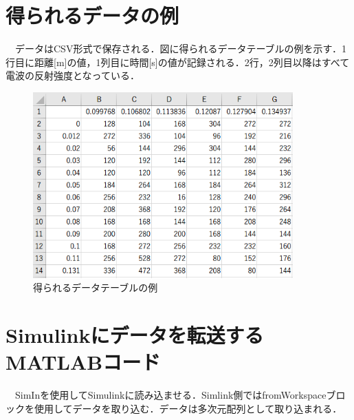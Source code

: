 \newpage
\section{得られるデータの例}
　データはCSV形式で保存される．図に得られるデータテーブルの例を示す．1行目に距離[m]の値，1列目に時間[s]の値が記録される．2行，2列目以降はすべて電波の反射強度となっている．
\begin{figure}[H]
  \centering
  \includegraphics[width=10cm]{./fig/data_table_example.png}
  \caption{得られるデータテーブルの例}
  \label{fig:data_table_example}
\end{figure}

\newpage
\section{Simulinkにデータを転送するMATLABコード}
　SimInを使用してSimulinkに読み込ませる．Simlink側ではfromWorkspaceブロックを使用してデータを取り込む．データは多次元配列として取り込まれる．

